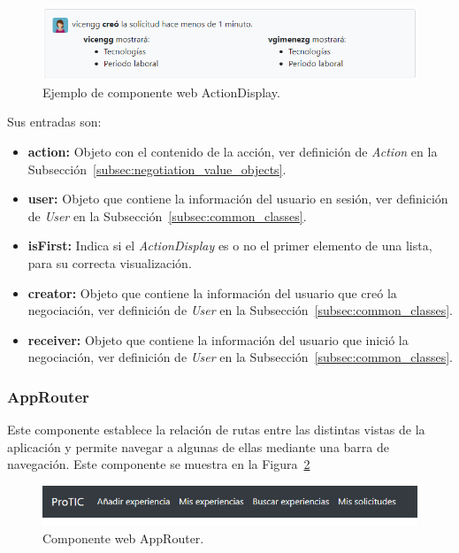\documentclass[a4paper, 12pt]{book}
\begin{document}
\begin{figure}
  \centering
  \includegraphics[width=15cm, keepaspectratio]{img/ActionDisplay.PNG}
  \caption{Ejemplo de componente web ActionDisplay.}\label{fig:component_action_display}
\end{figure}

Sus entradas son:

		\begin{itemize}
		\item \textbf{action:} Objeto con el contenido de la acción, ver definición de \emph{Action} en la Subsección~\ref{subsec:negotiation_value_objects}.
		\item \textbf{user:} Objeto que contiene la información del usuario en sesión, ver definición de \emph{User} en la Subsección~\ref{subsec:common_classes}.
		\item \textbf{isFirst:} Indica si el \emph{ActionDisplay} es o no el primer elemento de una lista, para su correcta visualización.
		\item \textbf{creator:} Objeto que contiene la información del usuario que creó la negociación, ver definición de \emph{User} en la Subsección~\ref{subsec:common_classes}.
		\item \textbf{receiver:} Objeto que contiene la información del usuario que inició la negociación, ver definición de \emph{User} en la Subsección~\ref{subsec:common_classes}.
		\end{itemize}

\subsubsection{AppRouter}
\label{subsec:wc_app_router}
Este componente establece la relación de rutas entre las distintas vistas de la aplicación y permite navegar a algunas de ellas mediante una barra de navegación.
Este componente se muestra en la Figura~\ref{fig:component_app_router}

\begin{figure}
  \centering
  \includegraphics[width=15cm, keepaspectratio]{img/AppRouter.PNG}
  \caption{Componente web AppRouter.}\label{fig:component_app_router}
\end{figure}
\end{document}
